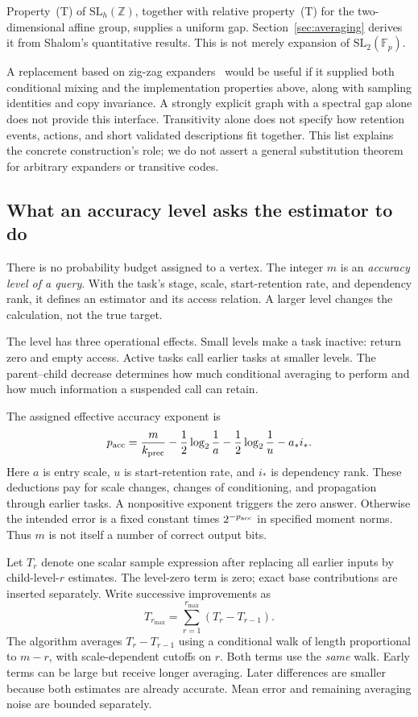 \documentclass[11pt]{article}
\numberwithin{equation}{section}
\theoremstyle{definition}
\theoremstyle{remark}
\begin{document}
Property~(T) of \(\mathrm{SL}_h(\mathbb Z)\), together with relative property~(T) for the two-dimensional affine group, supplies a uniform gap. Section~\ref{sec:averaging} derives it from Shalom's quantitative results. This is not merely expansion of \(\mathrm{SL}_2(\mathbb F_p)\).

A replacement based on zig-zag expanders~\cite{ReingoldVadhanWigderson2002} would be useful if it supplied both conditional mixing and the implementation properties above, along with sampling identities and copy invariance. A strongly explicit graph with a spectral gap alone does not provide this interface. Transitivity alone does not specify how retention events, actions, and short validated descriptions fit together. This list explains the concrete construction's role; we do not assert a general substitution theorem for arbitrary expanders or transitive codes.

\subsection{What an accuracy level asks the estimator to do}

There is no probability budget assigned to a vertex. The integer \(m\) is an \emph{accuracy level of a query}. With the task's stage, scale, start-retention rate, and dependency rank, it defines an estimator and its access relation. A larger level changes the calculation, not the true target.

The level has three operational effects. Small levels make a task inactive: return zero and empty access. Active tasks call earlier tasks at smaller levels. The parent--child decrease determines how much conditional averaging to perform and how much information a suspended call can retain.

The assigned effective accuracy exponent is
\begin{equation}
 p_{\rm acc}=\frac{m}{k_{\rm prec}}
       -\frac12\log_2\frac1a-\frac12\log_2\frac1u-a_*i_*.
 \label{eq:overview-accuracy}
\end{equation}
Here \(a\) is entry scale, \(u\) is start-retention rate, and \(i_*\) is dependency rank. These deductions pay for scale changes, changes of conditioning, and propagation through earlier tasks. A nonpositive exponent triggers the zero answer. Otherwise the intended error is a fixed constant times \(2^{-p_{\rm acc}}\) in specified moment norms. Thus \(m\) is not itself a number of correct output bits.

Let \(T_r\) denote one scalar sample expression after replacing all earlier inputs by child-level-\(r\) estimates. The level-zero term is zero; exact base contributions are inserted separately. Write successive improvements as
\[
 T_{r_{\max}}=\sum_{r=1}^{r_{\max}}(T_r-T_{r-1}).
\]
The algorithm averages \(T_r-T_{r-1}\) using a conditional walk of length proportional to \(m-r\), with scale-dependent cutoffs on \(r\). Both terms use the \emph{same} walk. Early terms can be large but receive longer averaging. Later differences are smaller because both estimates are already accurate. Mean error and remaining averaging noise are bounded separately.
\end{document}
